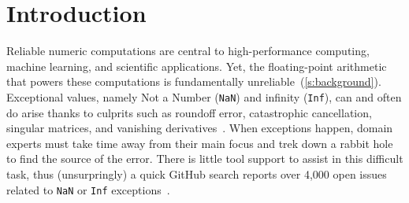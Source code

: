 \documentclass{juliacon}
\begin{document}
\setlength{\parindent}{1.2em}


\maketitle

\begin{abstract}
  Reliable numerical computations are central to high-performance computing and machine learning.
  We present FlowFPX: a tool set for debugging floating-point code.
  FlowFPX is composed of two primary parts: FloatTracker, a Julia-based tool for tracking the onset and flow of floating-point exceptions; and CSTG, a stack trace visualizer.
  FlowTracker's design exploits Julia's operator overloading to trace exception flows and even inject exceptions to accelerate testing.
  We present intuitive visualizations of summarized exception flows including how they are generated, propagated and killed, thus helping with debugging and repair.
\end{abstract}

\newcommand{\code}[1]{\texttt{#1}}
\newcommand{\FlowFPX}{FlowFPX}
\newcommand{\GPUFPX}{GPU-FPX}
\newcommand{\FloatTracker}{FloatTracker}
\newcommand{\FT}{\FloatTracker}
\newcommand{\Fp}{Floating-point} %
\newcommand{\fp}{floating-point} %
\newcommand{\CSTG}{stack graph}
\newcommand{\CPP}{\code{C++}}
\newcommand{\Dendro}{\textsc{Dendro}}
\newcommand{\urlaccess}[2]{\url{#1}}
\newcommand{\Nan}{\code{NaN}}
\newcommand{\NaN}{\Nan}
\newcommand{\Inf}{\code{Inf}}
\newcommand{\zerowidth}[1]{\makebox[0pt][l]{#1}}
\newcommand{\zerocode}[1]{\zerowidth{\code{#1}}}

\section{Introduction}

Reliable numeric computations are central to high-performance computing,
machine learning, and scientific applications.
Yet, the \fp{} arithmetic that powers these computations is fundamentally
unreliable~(\cref{s:background}).
Exceptional values, namely Not a Number (\Nan{}) and infinity (\Inf{}),
can and often do arise thanks to culprits such as roundoff error,
catastrophic cancellation, singular matrices, and vanishing
derivatives~\cite{sdjmrstp-pc-2022,ddghlllprr-correctness-2022,gllprt-correctness-2021,fpchecker-reports,llg-soap-2022,bllmg-xloop-2022}.
When exceptions happen, domain experts must take time away from their main
focus and trek down a rabbit hole to find the source of the error.
There is little tool support to assist in this difficult task,
thus (unsurpringly) a quick GitHub search reports over 4,000 open issues
related to \NaN{} or \Inf{} exceptions~\cite{github-issues}.
\end{document}
